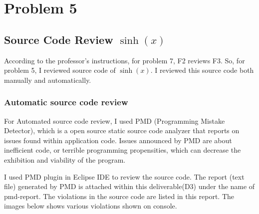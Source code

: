 \documentclass{article}
\begin{document}
\pagebreak
\chapter{Problem 5}
\section{Source Code Review $\sinh(x)$}
 According to the professor's instructions, for problem 7, F2 reviews F3. So, for problem 5, I reviewed source code of $\sinh(x)$. I reviewed this source code both manually and automatically. 
 \subsection{Automatic source code review}
 For Automated source code review, I used PMD (Programming Mistake Detector), which is a open source static source code analyzer that reports on issues found within application code. Issues announced by PMD are about inefficient code, or terrible programming propensities, which can decrease the exhibition and viability of the program.
 \begin{flushleft}
 I used PMD plugin in Eclipse IDE to review the source code. The report (text file) generated by PMD is attached within this  deliverable(D3) under the name of pmd-report. The violations in the source code are listed in this report.
 The images below shows various violations shown on console.
 \end{flushleft}
 
\end{document}
